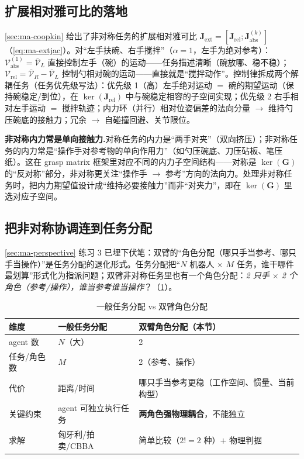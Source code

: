 \subsection{扩展相对雅可比的落地}
\label{sec:ma-extjac-landing}

\cref{sec:ma-coopkin} 给出了非对称任务的扩展相对雅可比 $\mathbf{J}_{\text{ext}}=[\mathbf{J}_{\text{rel}};\mathbf{J}_{\text{abs}}^{(k)}]$（\cref{eq:ma-extjac}）。对“左手扶碗、右手搅拌”（$\alpha=1$，左手为绝对参考）：$\boldsymbol{\mathcal{V}}_{\text{abs}}^{(1)}=\bar{\boldsymbol{\mathcal{V}}}_L$ 直接控制左手（碗）的运动——任务描述清晰（碗放哪、稳不稳）；$\boldsymbol{\mathcal{V}}_{\text{rel}}=\bar{\boldsymbol{\mathcal{V}}}_R-\bar{\boldsymbol{\mathcal{V}}}_L$ 控制勺相对碗的运动——直接就是“搅拌动作”。控制律拆成两个解耦任务（任务优先级写法）：优先级 1（高）左手绝对运动 $=$ 碗的期望运动（保持碗稳定/到位），在 $\ker(\mathbf{J}_{\text{rel}})$ 中与碗稳定相容的子空间实现；优先级 2 右手相对左手运动 $=$ 搅拌轨迹；内力环（并行）相对位姿偏差的法向分量 $\to$ 维持勺压碗底的接触力；冗余 $\to$ 自碰撞回避、关节限位。

\begin{note}
\textbf{非对称内力常是单向接触力.}\;对称任务的内力是“两手对夹”（双向挤压）；非对称任务的内力常是“操作手对参考物的单向作用力”（如勺压碗底、刀压砧板、笔压纸）。这在 grasp matrix 框架里对应不同的内力子空间结构——对称是 $\ker(\mathbf{G})$ 的“反对称”部分，非对称更关注“操作手 $\to$ 参考”方向的法向力。处理非对称任务时，把内力期望值设计成“维持必要接触力”而非“对夹力”，即在 $\ker(\mathbf{G})$ 里选对应子空间。
\end{note}

\subsection{把非对称协调连到任务分配}
\label{sec:ma-roleassign}

\cref{sec:ma-perspective} 练习 3 已埋下伏笔：双臂的“角色分配（哪只手当参考、哪只手当操作）”是任务分配的退化形式。任务分配把“$N$ 机器人 $\times$ $M$ 任务，谁干哪件最划算”形式化为指派问题；双臂非对称任务里也有一个角色分配：\emph{2 只手 $\times$ 2 个角色（参考/操作），谁当参考谁当操作}？（\cref{tab:ma-roleassign}）。

\begin{table}[H]\centering\small
\caption{一般任务分配 vs 双臂角色分配}
\label{tab:ma-roleassign}
\begin{tabular}{lll}
\toprule
维度 & 一般任务分配 & 双臂角色分配（本节） \\
\midrule
agent 数 & $N$（大） & 2 \\
任务/角色数 & $M$ & 2（参考、操作） \\
代价 & 距离/时间 & 哪只手当参考更稳（工作空间、惯量、当前构型） \\
关键约束 & agent 可独立执行任务 & \textbf{两角色强物理耦合}，不能独立 \\
求解 & 匈牙利/拍卖/CBBA & 简单比较（$2!=2$ 种）$+$ 物理判据 \\
\bottomrule
\end{tabular}
\end{table}

